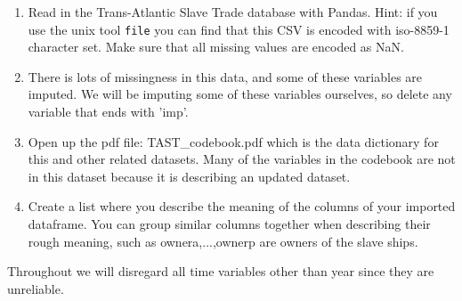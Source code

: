 \documentclass[11pt]{article}
\providecommand{\tightlist}{%
      \setlength{\itemsep}{0pt}\setlength{\parskip}{0pt}}
\begin{document}
\begin{enumerate}
\def\labelenumi{\arabic{enumi}.}
\tightlist
\item
  Read in the Trans-Atlantic Slave Trade database with Pandas. Hint: if
  you use the unix tool \texttt{file} you can find that this CSV is
  encoded with iso-8859-1 character set. Make sure that all missing
  values are encoded as NaN.
\item
  There is lots of missingness in this data, and some of these variables
  are imputed. We will be imputing some of these variables ourselves, so
  delete any variable that ends with 'imp'.
\item
  Open up the pdf file: TAST\_codebook.pdf which is the data dictionary
  for this and other related datasets. Many of the variables in the
  codebook are not in this dataset because it is describing an updated
  dataset.
\item
  Create a list where you describe the meaning of the columns of your
  imported dataframe. You can group similar columns together when
  describing their rough meaning, such as ownera,...,ownerp are owners
  of the slave ships.
\end{enumerate}

Throughout we will disregard all time variables other than year since
they are unreliable.
\end{document}
